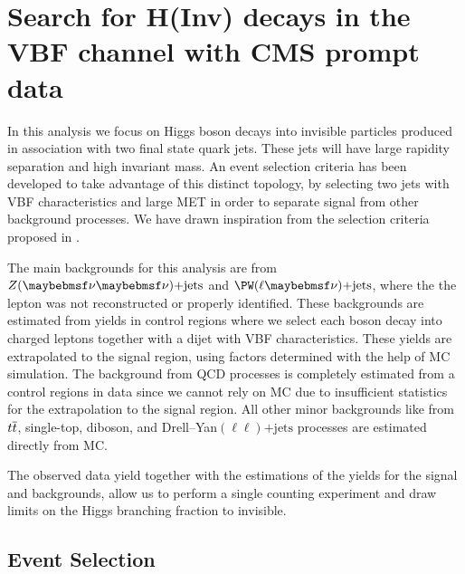 \chapter{Search for H(Inv) decays in the VBF channel with CMS prompt data}
\label{CHAPTER:PromptDataAnalysis}

\glsresetall %


In this analysis we focus on Higgs boson decays into invisible particles produced in association with two final state quark jets. These jets will have large rapidity separation and high invariant mass. An event selection criteria has been developed to take advantage of this distinct topology, by selecting two jets with \gls{VBF} characteristics and large \gls{MET} in order to separate signal from other background processes. We have drawn inspiration from the selection criteria proposed in \cite{ARTICLE:Zeppenfeld_ObservingAnInvisibleHiggsboson}.

The main backgrounds for this analysis are from $\Z (\nu \nu)\text{+jets}$ and $\PW (\ell \nu)\text{+jets}$, where the the lepton was not reconstructed or properly identified. These backgrounds are estimated from yields in control regions where we select each boson decay into charged leptons together with a dijet with \gls{VBF} characteristics. These yields are extrapolated to the signal region, using factors determined with the help of \gls{MC} simulation. The background from \gls{QCD} processes is completely estimated from a control regions in data since we cannot rely on \gls{MC} due to insufficient statistics for the extrapolation to the signal region. All other minor backgrounds like from $t\overline{t}$, single-top, diboson, and Drell--Yan$(\ell\ell)\text{+jets}$ processes are estimated directly from \gls{MC}. 

The observed data yield together with the estimations of the yields for the signal and backgrounds, allow us to perform a single counting experiment and draw limits on the Higgs branching fraction to invisible.

\section{Event Selection}
\label{SECTION:PromptDataAnalysis_EventSelection}

